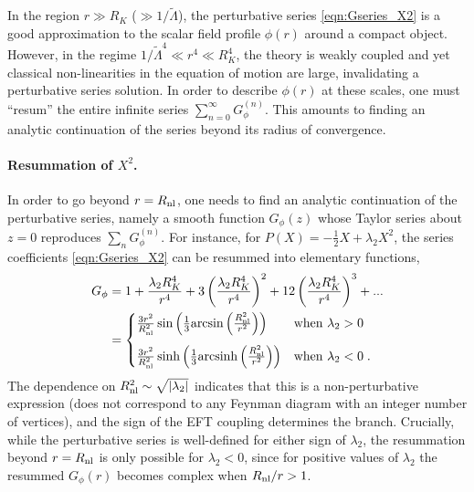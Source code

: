 \documentclass[11pt]{article}
\newcommand{\LambdaP}{\tilde{\Lambda}}
\begin{document}
In the region $r \gg R_K$ ($\gg 1/\LambdaP$), the perturbative series \eqref{eqn:Gseries_X2} is a good approximation to the scalar field profile $\phi (r)$ around a compact object. 
However, in the regime $1/ \LambdaP^4 \ll r^4 \ll R_K^4$, the theory is weakly coupled and yet classical non-linearities in the equation of motion are large, invalidating a perturbative series solution. 
In order to describe $\phi (r)$ at these scales, one must ``resum'' the entire infinite series $\sum_{n=0}^\infty G_\phi^{(n)}$. This amounts to finding an analytic continuation of the series beyond its radius of convergence. 

\paragraph{Resummation of $X^2$.}
In order to go beyond $r = R_{\rm nl}$, one needs to find an analytic continuation of the perturbative series, namely a smooth function $G_{\phi} (z)$ whose Taylor series about $z=0$ reproduces $\sum_{n} G_{\phi}^{(n)}$. 
For instance, for $P(X) = -\frac{1}{2} X + \lambda_2 X^2$, the series coefficients \eqref{eqn:Gseries_X2} can be resummed into elementary functions, 
\begin{align}
 G_\phi &= 1 +    \frac{ \lambda_2 R_K^4 }{r^4}  +   3 \left( \frac{ \lambda_2  R_K^4 }{r^4 } \right)^2  + 12 \left(\frac{ \lambda_2  R_K^4 }{r^4 } \right)^3 +  ...  
 \nonumber \\
 &= \begin{cases}
  \frac{ 3 r^2 }{ R_{\rm nl}^2 } \sin \left( \frac{1}{3}   \text{arcsin} \left(  \frac{R_{\rm nl}^2 }{r^2}  \right) \right) &\text{when } \lambda_2 > 0 \\[10pt]
  \frac{ 3 r^2 }{ R_{\rm nl}^2 } \sinh \left( \frac{1}{3}  \text{arcsinh} \left(  \frac{R_{\rm nl}^2 }{r^2}   \right)  \right) &\text{when } \lambda_2 < 0  \; .   
  \end{cases}
 \label{eqn:Gresum_X2} 
\end{align}
The dependence on $R_{\rm nl}^2 \sim \sqrt{|\lambda_2|}$ indicates that this is a non-perturbative expression (does not correspond to any Feynman diagram with an integer number of vertices), and the sign of the EFT coupling determines the branch.  
Crucially, while the perturbative series is well-defined for either sign of $\lambda_2$, the resummation beyond $r =R_{\rm nl}$ is only possible for $\lambda_2 < 0$, since for positive values of $\lambda_2$ the resummed $G_\phi(r)$ becomes complex when $R_{\rm nl}/r > 1$. 
\end{document}
